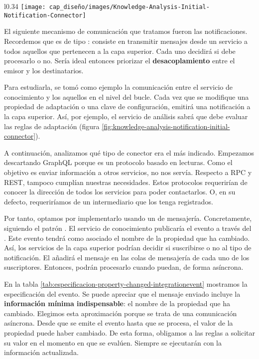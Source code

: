 \begin{wrapfigure}{l}{0.34\linewidth}
  \centering
  \texttt{[image: cap\_diseño/images/Knowledge-Analysis-Initial-Notification-Connector]}
  \caption{Representación inicial del conector entre el servicio de conocimiento y el de análisis.}
  \label{fig:knowledge-analysis-notification-initial-connector}
  \vspace{-10pt}
\end{wrapfigure}

El siguiente mecanismo de comunicación que tratamos fueron las notificaciones. Recordemos que es de tipo \textbf{}: consiste en transmitir mensajes desde un servicio a todos aquellos que pertenecen a la capa superior. Cada uno decidirá si debe procesarlo o no. Sería ideal entonces priorizar el \textbf{desacoplamiento} entre el emisor y los destinatarios.

Para estudiarla, se tomó como ejemplo la comunicación entre el servicio de conocimiento y los aquellos en el nivel del bucle. Cada vez que se modifique una propiedad de adaptación o una clave de configuración, emitirá una notificación a la capa superior. Así, por ejemplo, el servicio de análisis sabrá que debe evaluar las reglas de adaptación (figura \ref{fig:knowledge-analysis-notification-initial-connector}).

A continuación, analizamos qué tipo de conector era el más indicado. Empezamos descartando GraphQL porque es un protocolo basado en lecturas. Como el objetivo es enviar información a otros servicios, no nos servía. Respecto a RPC y REST, tampoco cumplían nuestras necesidades. Estos protocolos requerirían de conocer la dirección de todos los servicios para poder contactarlos. O, en su defecto, requeriríamos de un intermediario que los tenga registrados.

Por tanto, optamos por implementarlo usando un  de mensajería. Concretamente, siguiendo el patrón \textbf{}. El servicio de conocimiento publicaría el evento a través del . Este evento tendrá como  asociado el nombre de la propiedad que ha cambiado. Así, los servicios de la capa superior podrían decidir si suscribirse o no al tipo de notificación. El  añadirá el mensaje en las colas de mensajería de cada uno de los suscriptores. Entonces, podrán procesarlo cuando puedan, de forma asíncrona.

En la tabla \ref{tab:especificacion-property-changed-integrationevent} mostramos la especificación del evento. Se puede apreciar que el mensaje enviado incluye la \textbf{información mínima indispensable}: el nombre de la propiedad que ha cambiado. Elegimos esta aproximación porque se trata de una comunicación asíncrona. Desde que se emite el evento hasta que se procesa, el valor de la propiedad puede haber cambiado. De esta forma, obligamos a las reglas a solicitar su valor en el momento en que se evalúen. Siempre se ejecutarán con la información actualizada.

